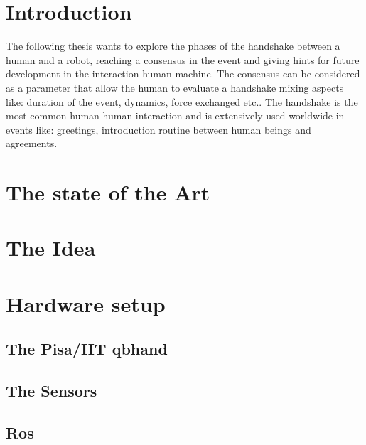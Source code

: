 \chapter*{Introduction}
The following thesis wants to explore the phases of the handshake between a human and a robot, reaching a consensus in the event and giving hints for future development in the interaction human-machine. The consensus can be considered as a parameter that allow the human to evaluate a handshake mixing aspects like: duration of the event, dynamics, force exchanged etc.. 
The handshake is the most common human-human interaction and is extensively used worldwide in events like: greetings, introduction routine between human beings and agreements. 

\chapter{The state of the Art}
\section{}
\section{}
\section{}
\chapter{The Idea}
\chapter{Hardware setup}
\section{The Pisa/IIT qbhand}
\section{The Sensors}
\section{}
\section{Ros}



